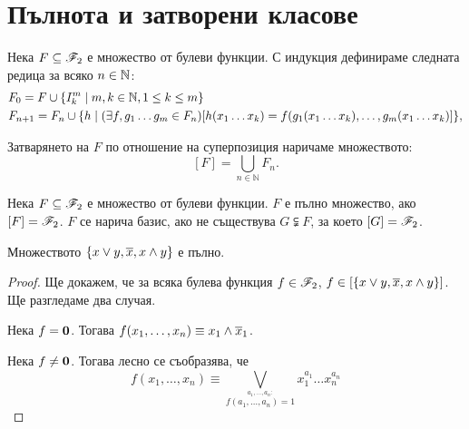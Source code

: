 \section{Пълнота и затворени класове}

\begin{dfn}
Нека $F\subseteq \mathscr{F}_2$ е множество от булеви функции. С
индукция дефинираме следната редица за всяко $n \in \mathbb{N}$:
\begin{align*}
  & F_0 = F\cup \{I^m_k \mid m,k\in\mathbb{N}, 1\leq k\leq m\}\\
  & F_{n+1} = F_n \cup \{h \mid (\exists f, g_1\dots g_m \in F_n)[h(x_1\dots x_k) =  f(g_1(x_1\dots x_k), \dots, g_m(x_1\dots x_k)]\},
\end{align*}

Затварянето на $F$ по отношение на суперпозиция наричаме
множеството:
\[[F] = \bigcup_{n\in \mathbb{N}}F_n.\]

\end{dfn}



\begin{dfn}
  Нека $F\subseteq \mathscr{F}_2$ е множество от булеви функции. 
  $F$ е пълно множество, ако $[F] = \mathscr{F}_2$.
  $F$ се нарича базис, ако не съществува $G \subsetneqq F$, за което $[G] = \mathscr{F}_2$.
\end{dfn}

\begin{thm}[Бул]
  Множеството $\{x\vee y,\overline{x},x\wedge y\}$ е пълно.
\end{thm}
\begin{proof}
  Ще докажем, че за всяка булева функция $f \in \mathscr{F}_2$, $f \in [\{x\vee y, \overline{x}, x \wedge y\}]$.
  Ще разгледаме два случая.
  
  Нека $f = \bf{0}$. Тогава $f(x_1,\dots,x_n) \equiv x_1\wedge\overline{x}_1$.
  
  Нека $f \neq \bf{0}$. Тогава лесно се съобразява, че
  \[f(x_1,\dots,x_n) \equiv \bigvee_{\stackrel{a_1,\dots,a_n:}{f(a_1,\dots,a_n) = 1}} x^{a_1}_1\dots x^{a_n}_n\]
\end{proof}

